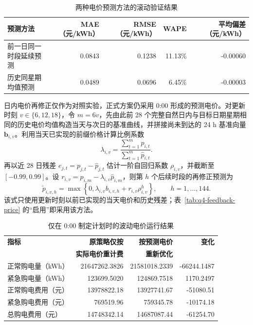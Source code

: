 \documentclass[12pt,a4paper]{ctexart}
\renewcommand{\textbf}[1]{{\CJKfamily{heiti}\bfseries #1}}
\begin{document}
\begin{table}[H]
\centering
\footnotesize
\setlength{\tabcolsep}{4pt}
\caption{两种电价预测方法的滚动验证结果}
\label{tab:q4-price-validation}
\renewcommand{\arraystretch}{1.15}
\begin{tabular}{lrrrr}
\toprule
\textbf{预测方法} & \textbf{MAE（元/kWh）} & \textbf{RMSE（元/kWh）} & \textbf{WAPE} & \textbf{平均偏差（元/kWh）} \\
\midrule
前一日同一时段延续预测 & 0.0843 & 0.1238 & 11.13\% & -0.00060 \\
历史同星期均值预测 & 0.0489 & 0.0696 & 6.45\% & -0.00003 \\
\bottomrule
\end{tabular}
\end{table}

\par\noindent\hspace*{2em}日内电价再修正仅作为对照实验，正式方案仍采用 0:00 形成的预测电价。对更新时刻 $v\in\{6,12,18\}$，令 $m=6v$，先由此前 28 个完整自然日内与目标日期星期相同的历史电价均值构造当天与次日的基准曲线，并拼接尚未到达的 24 h 基准向量 $\boldsymbol b_{i,v}$。利用当天已实现的前缀价格计算比例系数
\[
\lambda_{i,v}=\frac{\sum_{t=1}^{m}p_{i,t}}{\sum_{t=1}^{m}\widehat p_{i,t}}.
\]
再以近 28 日残差 $e_{j,t}=p_{j,t}-\widehat p_{j,t}$ 估计一阶自回归系数 $\rho_{i,v}$，并截断至 $[-0.99,0.99]$。设 $r_{i,v}=p_{i,m}-\lambda_{i,v}\widehat p_{i,m}$，则第 $h$ 个后续时段的再修正预测为
\[
\widetilde p_{i,v,h}=\max\left\{0,\lambda_{i,v}b_{i,v,h}+r_{i,v}\rho_{i,v}^{h}\right\},\qquad h=1,\ldots,144.
\]
该式只使用更新时刻以前已实现的当天电价和历史残差；表~\ref{tab:q4-feedback-price} 的“启用”即采用该方法。

\begin{table}[htbp]
\centering
\footnotesize
\setlength{\tabcolsep}{4pt}
\caption{仅在 0:00 制定计划时的波动电价运行结果}
\label{tab:q4-plan-result}
\renewcommand{\arraystretch}{1.15}
\begin{tabular}{lrrr}
\toprule
\textbf{指标} & \textbf{原策略仅按} & \textbf{按预测电价} & \textbf{变化} \\
& \textbf{实际电价重计费} & \textbf{重新优化} & \\
\midrule
正常购电量（kWh） & 21647262.3826 & 21581018.2339 & -66244.1487 \\
紧急购电量（kWh） & 123699.5020 & 124869.7518 & 1170.2497 \\
正常购电费用（元） & 13978822.18 & 13927741.67 & -51080.51 \\
紧急购电费用（元） & 769519.96 & 759345.78 & -10174.18 \\
总购电费用（元） & 14748342.14 & 14687087.44 & -61254.70 \\
\bottomrule
\end{tabular}
\end{table}
\end{document}
